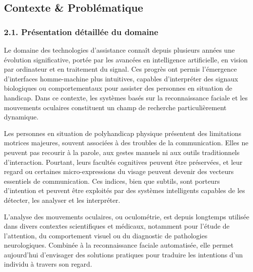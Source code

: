 \documentclass[
]{article}
\begin{document}
\hypertarget{section-25}{%
\subsection{}\label{section-25}}

\hypertarget{contexte-probluxe9matique}{%
\subsection{Contexte \& Problématique}\label{contexte-probluxe9matique}}

\hypertarget{pruxe9sentation-duxe9tailluxe9e-du-domaine}{%
\subsubsection{2.1. Présentation détaillée du domaine}\label{pruxe9sentation-duxe9tailluxe9e-du-domaine}}

Le domaine des technologies d'assistance connaît depuis plusieurs années une évolution significative, portée par les avancées en intelligence artificielle, en vision par ordinateur et en traitement du signal. Ces progrès ont permis l'émergence d'interfaces homme-machine plus intuitives, capables d'interpréter des signaux biologiques ou comportementaux pour assister des personnes en situation de handicap. Dans ce contexte, les systèmes basés sur la reconnaissance faciale et les mouvements oculaires constituent un champ de recherche particulièrement dynamique.

Les personnes en situation de polyhandicap physique présentent des limitations motrices majeures, souvent associées à des troubles de la communication. Elles ne peuvent pas recourir à la parole, aux gestes manuels ni aux outils traditionnels d'interaction. Pourtant, leurs facultés cognitives peuvent être préservées, et leur regard ou certaines micro-expressions du visage peuvent devenir des vecteurs essentiels de communication. Ces indices, bien que subtils, sont porteurs d'intention et peuvent être exploités par des systèmes intelligents capables de les détecter, les analyser et les interpréter.

L'analyse des mouvements oculaires, ou oculométrie, est depuis longtemps utilisée dans divers contextes scientifiques et médicaux, notamment pour l'étude de l'attention, du comportement visuel ou du diagnostic de pathologies neurologiques. Combinée à la reconnaissance faciale automatisée, elle permet aujourd'hui d'envisager des solutions pratiques pour traduire les intentions d'un individu à travers son regard.
\end{document}
